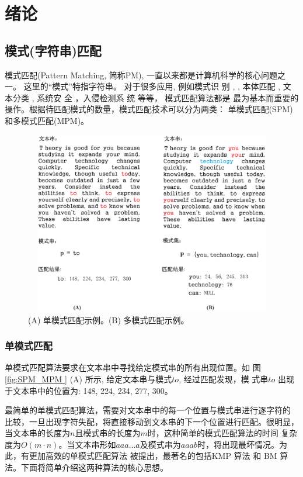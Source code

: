 \chapter{绪论}

\section{模式(字符串)匹配}

模式匹配(Pattern Matching, 简称PM), 一直以来都是计算机科学的核心问题之
一。 这里的“模式”特指字符串。 对于很多应用, 例如模式识
别 \cite{Yan2016}, \cite{Xiao2016}, 本体匹配 \cite{Xue2015}
\cite{Xue2016}, 文本分类 \cite{Tang2015} \cite{Zhang2016}, 系统安
全 \cite{Dien2014,Malhotra2016,Fan2016}，入侵检测系
统 \cite{Kim2015,Arney2016,Sadotra2016,Lee2017} 等等， 模式匹配算法都是
最为基本而重要的操作。根据待匹配模式的数量，模式匹配技术可以分为两类：
单模式匹配(SPM)和多模式匹配(MPM)。

\begin{figure}[!h]
  \centering
  \includegraphics[height=8cm ,width=12cm]{figures/1_Introduction/SPM_MPM.eps}
  \caption{(A) 单模式匹配示例。(B) 多模式匹配示例。}
  \label{fig:SPM_MPM}
\end{figure}


\subsection{单模式匹配}

单模式匹配算法要求在文本串中寻找给定模式串的所有出现位置。如
图 \ref{fig:SPM_MPM } (A) 所示, 给定文本串与模式$to$, 经过匹配发现，模
式串$to$ 出现于文本串中的位置为: 148, 224, 234, 277, 300。

最简单的单模式匹配算法，需要对文本串中的每一个位置与模式串进行逐字符的
比较，一旦出现字符失配，将直接移动到文本串的下一个位置进行匹配。很明显，
当文本串的长度为$n$且模式串的长度为$m$时，这种简单的模式匹配算法的时间
复杂度为$O(m \cdot
n)$。当文本串形如$aaa \dots
a$及模式串为$aaab$时，将出现最坏情况。为此，有更加高效的单模式匹配算法
被提出，最著名的包括KMP \cite{Knuth1977}算法 和 BM \cite{Boyer1977} 算
法。下面将简单介绍这两种算法的核心思想。

